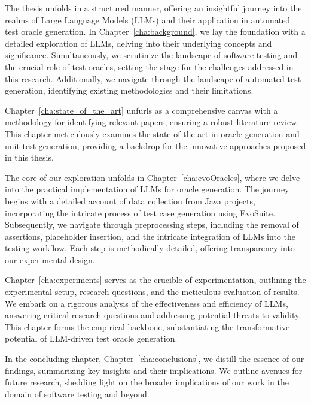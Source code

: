 The thesis unfolds in a structured manner, offering an insightful journey into the realms of Large Language Models (LLMs) and their application in automated test oracle generation. In Chapter~\ref{cha:background}, we lay the foundation with a detailed exploration of LLMs, delving into their underlying concepts and significance. Simultaneously, we scrutinize the landscape of software testing and the crucial role of test oracles, setting the stage for the challenges addressed in this research. Additionally, we navigate through the landscape of automated test generation, identifying existing methodologies and their limitations.

Chapter~\ref{cha:state_of_the_art} unfurls as a comprehensive canvas with a methodology for identifying relevant papers, ensuring a robust literature review. This chapter meticulously examines the state of the art in oracle generation and unit test generation, providing a backdrop for the innovative approaches proposed in this thesis.

The core of our exploration unfolds in Chapter~\ref{cha:evoOracles}, where we delve into the practical implementation of LLMs for oracle generation. The journey begins with a detailed account of data collection from Java projects, incorporating the intricate process of test case generation using EvoSuite. Subsequently, we navigate through preprocessing steps, including the removal of assertions, placeholder insertion, and the intricate integration of LLMs into the testing workflow. Each step is methodically detailed, offering transparency into our experimental design.

Chapter~\ref{cha:experiments} serves as the crucible of experimentation, outlining the experimental setup, research questions, and the meticulous evaluation of results. We embark on a rigorous analysis of the effectiveness and efficiency of LLMs, answering critical research questions and addressing potential threats to validity. This chapter forms the empirical backbone, substantiating the transformative potential of LLM-driven test oracle generation.

In the concluding chapter, Chapter~\ref{cha:conclusions}, we distill the essence of our findings, summarizing key insights and their implications. We outline avenues for future research, shedding light on the broader implications of our work in the domain of software testing and beyond.